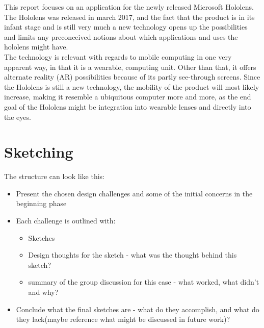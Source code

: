 \documentclass[11pt]{article}
\begin{document}
This report focuses on an application for the newly released Microsoft Hololens. The Hololens was released in march 2017, and the fact that the product is in its infant stage and is still very much a new technology opens up the possibilities and limits any preconceived notions about which applications and uses the hololens might have.\\
The technology is relevant with regards to mobile computing in one very apparent way, in that it is a wearable, computing unit. Other than that, it offers alternate reality (AR) possibilities because of its partly see-through screens. Since the Hololens is still a new technology, the mobility of the product will most likely increase, making it resemble a ubiquitous computer more and more, as the end goal of the Hololens might be integration into wearable lenses and directly into the eyes. 

\section{Sketching}
The structure can look like this:
\begin{itemize}
	\item Present the chosen design challenges and some of the initial concerns in the beginning phase
	\item Each challenge is outlined with:
		\begin{itemize}
			\item Sketches
			\item Design thoughts for the sketch - what was the thought behind this sketch?
			\item summary of the group discussion for this case - what worked, what didn't and why?
		\end{itemize}
	\item Conclude what the final sketches are - what do they accomplish, and what do they lack(maybe reference what might be discussed in future work)?
\end{itemize}
\end{document}
